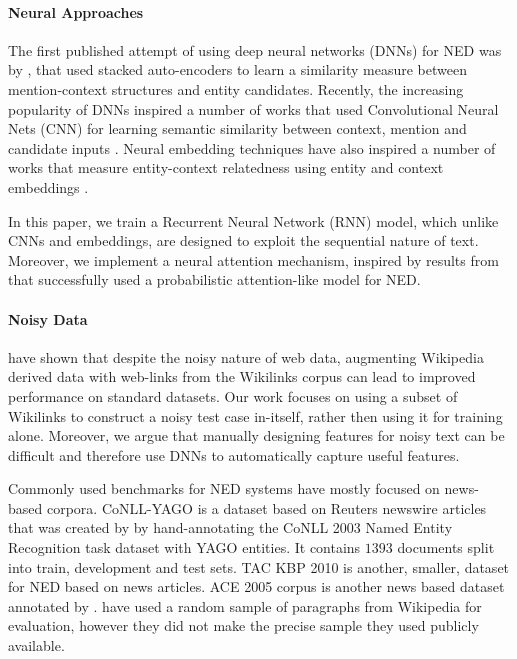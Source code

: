 \documentclass[11pt]{article}
\begin{document}

	\paragraph{Neural Approaches}
	
	The first published attempt of using deep neural networks (DNNs) for NED was by , that used stacked auto-encoders to learn a similarity measure between mention-context structures and entity candidates. Recently, the increasing popularity of DNNs inspired a number of works that used Convolutional Neural Nets (CNN) for learning semantic similarity between context, mention and candidate inputs \cite{sun2015modeling,francis2016capturing}. Neural embedding techniques have also inspired a number of works that measure entity-context relatedness using entity and context embeddings \cite{yamada2016joint,Hu2015Entity}.
	
	In this paper, we train a Recurrent Neural Network (RNN) model, which unlike CNNs and embeddings, are designed to exploit the sequential nature of text. Moreover, we implement a neural attention mechanism, inspired by results from  that successfully used a probabilistic attention-like model for NED.
	
	\paragraph{Noisy Data}
	
	 have shown that despite the noisy nature of web data, augmenting Wikipedia derived data with web-links from the Wikilinks corpus \cite{singh12:wiki-links} can lead to improved performance on standard datasets. Our work focuses on using a subset of Wikilinks to construct a noisy test case in-itself, rather then using it for training alone. Moreover, we argue that manually designing features for noisy text can be difficult and therefore use DNNs to automatically capture useful features.
	
	Commonly used benchmarks for NED systems have mostly focused on news-based corpora. CoNLL-YAGO is a dataset based on Reuters newswire articles that was created by  by hand-annotating the CoNLL 2003 Named Entity Recognition task dataset with YAGO entities. It contains $1393$ documents split into train, development and test sets. TAC KBP 2010 \cite{ji2010overview} is another, smaller, dataset for NED based on news articles. ACE 2005 corpus is another news based dataset annotated by .  have used a random sample of paragraphs from Wikipedia for evaluation, however they did not make the precise sample they used publicly available. 
	
\end{document}
